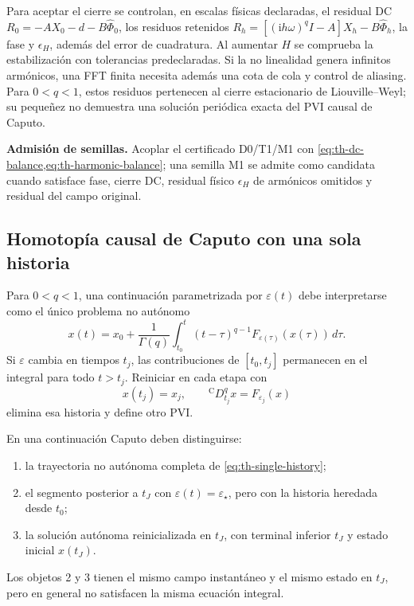 Para aceptar el cierre se controlan, en escalas físicas declaradas, el
residual DC \(R_0=-AX_0-d-B\widehat\Phi_0\), los residuos retenidos
\(R_h=[(\mathrm ih\omega)^qI-A]X_h-B\widehat\Phi_h\), la fase y
\(\epsilon_H\), además del error de cuadratura. Al aumentar \(H\) se
comprueba la estabilización con tolerancias predeclaradas. Si la no linealidad
genera infinitos armónicos, una FFT finita necesita además una cota de cola y
control de aliasing. Para \(0<q<1\), estos residuos pertenecen al cierre
estacionario de Liouville--Weyl; su pequeñez no demuestra una solución
periódica exacta del PVI causal de Caputo.

\begin{proposalbox}
\textbf{Admisión de semillas.} Acoplar el certificado D0/T1/M1 con
\cref{eq:th-dc-balance,eq:th-harmonic-balance}; una semilla M1 se admite como
candidata cuando satisface fase, cierre DC, residual físico \(\epsilon_H\) de
armónicos omitidos y
residual del campo original.
\end{proposalbox}

\subsection{Homotopía causal de Caputo con una sola historia}
\label{sec:single-history}

Para \(0<q<1\), una continuación parametrizada por
\(\varepsilon(t)\) debe interpretarse como el único problema no autónomo
\begin{equation}
 x(t)=x_0+\frac1{\Gamma(q)}
 \int_{t_0}^{t}(t-\tau)^{q-1}
 F_{\varepsilon(\tau)}(x(\tau))\,d\tau.
 \label{eq:th-single-history}
\end{equation}
Si \(\varepsilon\) cambia en tiempos \(t_j\), las contribuciones de
\([t_0,t_j]\) permanecen en el integral para todo \(t>t_j\). Reiniciar en cada
etapa con
\[
 x(t_j)=x_j,\qquad
 {}^{\mathrm C}D_{t_j}^q x=F_{\varepsilon_j}(x)
\]
elimina esa historia y define otro PVI.

\begin{proposition}
\label{prop:history-three-objects}
En una continuación Caputo deben distinguirse:
\begin{enumerate}
 \item la trayectoria no autónoma completa de
 \cref{eq:th-single-history};
 \item el segmento posterior a \(t_J\) con
 \(\varepsilon(t)=\varepsilon_\star\), pero con la historia heredada desde
 \(t_0\);
 \item la solución autónoma reinicializada en \(t_J\), con terminal inferior
 \(t_J\) y estado inicial \(x(t_J)\).
\end{enumerate}
Los objetos 2 y 3 tienen el mismo campo instantáneo y el mismo estado en
\(t_J\), pero en general no satisfacen la misma ecuación integral.
\end{proposition}

